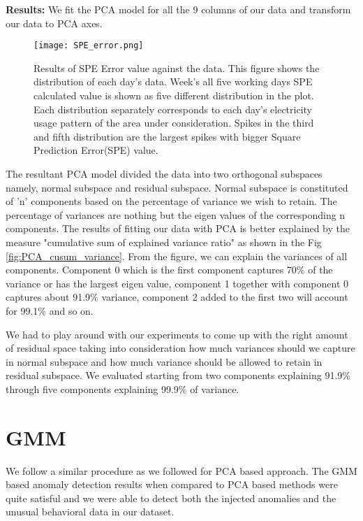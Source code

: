 \textbf{Results:} We fit the PCA model for all the 9 columns of our data and transform our data to PCA axes. 
\begin{figure}
\centerline{\texttt{[image: SPE\_error.png]}}
    \caption{Results of SPE Error value against the data. This figure shows the distribution of each day's data. Week's all five working days SPE calculated value is shown as five different distribution in the plot. Each distribution separately corresponds to each day's electricity usage pattern of the area under consideration. Spikes in the third and fifth distribution are the largest spikes with bigger Square Prediction Error(SPE) value.}
    \label{fig:spe}
\end{figure}The resultant PCA model divided the data into two orthogonal subspaces namely, normal subspace and residual subspace. Normal subspace is constituted of 'n' components based on the percentage of variance we wish to retain. The percentage of variances are nothing but the eigen values of the corresponding n components. The results of fitting our data with PCA is better explained by the measure "cumulative sum of explained variance ratio" as shown in the Fig \ref{fig:PCA_cusum_variance}. From the figure, we can explain the variances of all components. Component 0 which is the first component captures 70\% of the variance or has the largest eigen value, component 1 together with component 0 captures about 91.9\% variance, component 2 added  to the first two will account for 99.1\% and so on. 

We had to play around with our experiments to come up with the right amount of residual space taking into consideration how much variances should we capture in normal subspace and how much variance should be allowed to retain in residual subspace. We evaluated starting from two components explaining 91.9\% through five components explaining 99.9\% of variance.\\


\section{GMM}

We follow a similar procedure as we followed for PCA based approach. The GMM based anomaly detection results when compared to PCA based methods were quite satisful and we were able to detect both the injected anomalies and the unusual behavioral data in our dataset.

